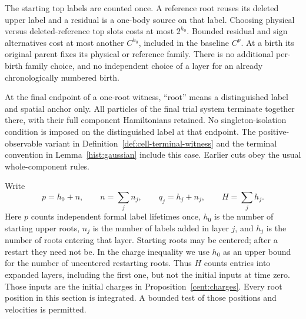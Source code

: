 The starting top labels are counted once. A reference root reuses
its deleted upper label and a residual is a one-body source on
that label. Choosing physical versus deleted-reference top slots
costs at most $2^{h_0}$. Bounded residual and sign alternatives
cost at most another $C^{h_0}$, included in the baseline $C^p$.
At a birth its original parent fixes its physical or reference
family. There is no additional per-birth family choice, and no
independent choice of a layer for an already chronologically
numbered birth.

At the final endpoint of a one-root witness, ``root'' means a
distinguished label and spatial anchor only. All particles of the
final trial system terminate together there, with their full
component Hamiltonians retained. No singleton-isolation condition
is imposed on the distinguished label at that endpoint. The
positive-observable variant in
Definition~\ref{def:cell-terminal-witness} and
the terminal convention in Lemma~\ref{hist:gaussian} include
this case. Earlier cuts obey the usual whole-component rules.

Write
\[
 p=h_0+n,\qquad n=\sum_jn_j,\qquad
 q_j=h_j+n_j,\qquad H=\sum_jh_j.
\]
Here $p$ counts independent formal label lifetimes once, $h_0$ is
the number of starting upper roots, $n_j$ is the number of labels
added in layer $j$, and $h_j$ is the number of roots entering that
layer. Starting roots may be centered; after a restart they need
not be. In the charge inequality we use $h_0$ as an upper bound
for the number of uncentered restarting roots. Thus $H$ counts
entries into expanded layers, including the first one, but not
the initial inputs at time zero. Those inputs are the initial
charges in Proposition~\ref{cent:charges}. Every root position
in this section is integrated. A bounded test of those positions
and velocities is permitted.

